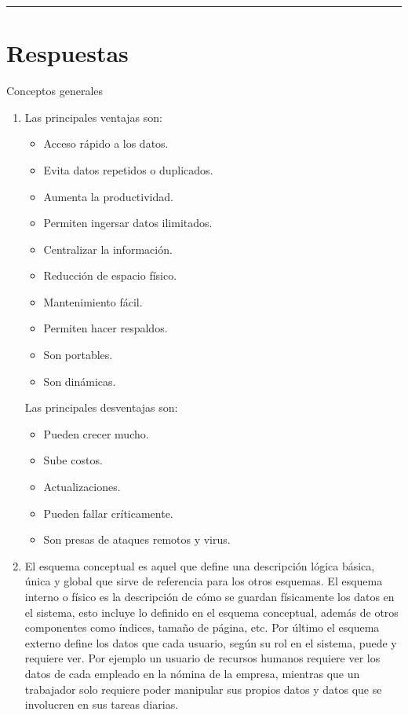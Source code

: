 \documentclass{exam}
\begin{document}
\noindent
\rule[2ex]{\textwidth}{2pt}

\section*{Respuestas}
\begin{questions}
	\question Conceptos generales
	\begin{enumerate}[label=\alph*.]
		\item Las principales ventajas son:
		    \begin{itemize}
		        \item Acceso rápido a los datos.
		        \item Evita datos repetidos o duplicados.
		        \item Aumenta la productividad.
		        \item Permiten ingersar datos ilimitados.
		        \item Centralizar la información.
		        \item Reducción de espacio físico.
		        \item Mantenimiento fácil.
		        \item Permiten hacer respaldos.
		        \item Son portables.
		        \item Son dinámicas.
		    \end{itemize}
		    Las principales desventajas son:
		    \begin{itemize}
		        \item Pueden crecer mucho.
		        \item Sube costos.
		        \item Actualizaciones.
		        \item Pueden fallar críticamente.
		        \item Son presas de ataques remotos y virus.
		    \end{itemize}

		\item El esquema conceptual es aquel que define una descripción lógica básica, única y global que sirve de referencia para los otros esquemas. El esquema interno o físico es la descripción de cómo se guardan físicamente los datos en el sistema, esto incluye lo definido en el esquema conceptual, además de otros componentes como índices, tamaño de página, etc. Por último el esquema externo define los datos que cada usuario, según su rol en el sistema, puede y requiere ver. Por ejemplo un usuario de recursos humanos requiere ver los datos de cada empleado en la nómina de la empresa, mientras que un trabajador solo requiere poder manipular sus propios datos y datos que se involucren en sus tareas diarias.
		

\end{enumerate}
\end{questions}
\end{document}
